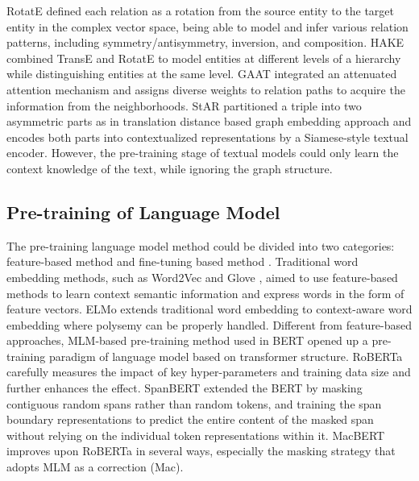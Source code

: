 \documentclass[journal]{IEEEtran}
\begin{document}
RotatE \cite{sun2018rotate} defined each relation as a rotation from the source entity to the target entity in the complex vector space, being able to model and infer various relation patterns, including symmetry/antisymmetry, inversion, and composition. 
HAKE \cite{zhang2020learning} combined TransE and RotatE to model entities at different levels of a hierarchy while distinguishing entities at the same level. 
GAAT \cite{wang2019knowledge} integrated an attenuated attention mechanism and assigns diverse weights to relation paths to acquire the information from the neighborhoods. 
StAR \cite{wang2021structure} partitioned a triple into two asymmetric parts as in translation distance based graph embedding approach and encodes both parts into contextualized representations by a Siamese-style textual encoder. However, the pre-training stage of textual models could only learn the context knowledge of the text, while ignoring the graph structure. 

\subsection{Pre-training of Language Model}
The pre-training language model method could be divided into two categories: feature-based method and fine-tuning based method \cite{cui2021pre,qiang2021lsbert}. Traditional word embedding methods, such as Word2Vec \cite{mikolov2013distributed} and Glove \cite{pennington2014glove}, aimed to use feature-based methods to learn context semantic information and express words in the form of feature vectors. ELMo \cite{sarzynska2021detecting} extends traditional word embedding to context-aware word embedding where polysemy can be properly handled. Different from feature-based approaches, 
MLM-based pre-training method used in BERT \cite{devlin2018bert} opened up a pre-training paradigm of language model based on transformer structure. 
RoBERTa \cite{liu2019roberta} carefully measures the impact of key hyper-parameters and training data size and further enhances the effect. 
SpanBERT \cite{joshi2020spanbert} extended the BERT by masking contiguous random spans rather than random tokens, and training the span boundary representations to predict the entire content of the masked span without relying on the individual token representations within it. 
MacBERT \cite{cui2020revisiting} improves upon RoBERTa in several ways, especially the masking strategy that adopts MLM as a correction (Mac). 
\end{document}
